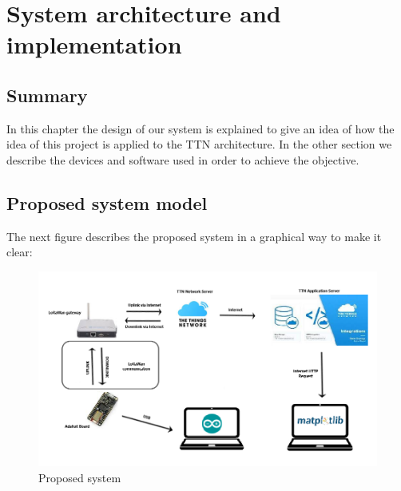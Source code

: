 
\chapter{System architecture and implementation}
\label{chap:third}
\ifpdf
    \graphicspath{{Chapter3/Figures/PNG/}{Chapter3/Figures/PDF/}{Chapter3/Figures/}}
\else
    \graphicspath{{Chapter3/Figures/EPS/}{Chapter3/Figures/}}
\fi


\section*{Summary}
In this chapter the design of our system is explained to give an
idea of how the idea of this project is applied to the TTN architecture.
In the other section we describe the devices and software used in order
to achieve the objective.

\section{Proposed system model}
\label{sec:s-system}
The next figure describes the proposed system in a graphical way to make it clear:
\begin{figure}[htbp]
    \includegraphics[width=\linewidth]{System.png}
    \caption{Proposed system}
\end{figure}

